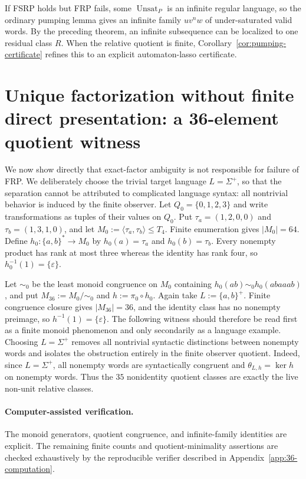\documentclass[11pt,a4paper]{article}
\newcommand{\eps}{\varepsilon}
\newcommand{\Unsat}{\operatorname{Unsat}}
\begin{document}
If FSRP holds but FRP fails, some $\Unsat_P$ is an infinite regular language, so the ordinary pumping lemma gives an infinite family $uv^nw$ of under-saturated valid words.  By the preceding theorem, an infinite subsequence can be localized to one residual class $R$.  When the relative quotient is finite, Corollary~\ref{cor:pumping-certificate} refines this to an explicit automaton-lasso certificate.

\section{Unique factorization without finite direct presentation: a 36-element quotient witness}
\label{sec:36}

We now show directly that exact-factor ambiguity is not responsible for
failure of FRP.  We deliberately choose the trivial target language
$L=\Sigma^+$, so that the separation cannot be attributed to complicated
language syntax: all nontrivial behavior is induced by the finite observer.
Let $Q_0=\{0,1,2,3\}$ and write transformations as
tuples of their values on $Q_0$.  Put
\(\tau_a=(1,2,0,0)\) and \(\tau_b=(1,3,1,0)\), and let
\(M_0:=\langle\tau_a,\tau_b\rangle\le T_4.\)
Finite enumeration gives $|M_0|=64$.  Define
\(h_0:\{a,b\}^*\to M_0\) by
$h_0(a)=\tau_a$ and $h_0(b)=\tau_b$.  Every nonempty product has rank
at most three whereas the identity has rank four, so
\(h_0^{-1}(1)=\{\eps\}.\)

Let $\sim_0$ be the least monoid congruence on $M_0$ containing
\(h_0(ab)\sim_0h_0(abaaab)\), and put
\(M_{36}:=M_0/{\sim_0}\) and \(h:=\pi_0\circ h_0\).
Again take $L:=\{a,b\}^+$.  Finite congruence closure gives
$|M_{36}|=36$, and the identity class has no nonempty preimage, so
$h^{-1}(1)=\{\eps\}$.  The following witness should therefore be read first as a finite monoid phenomenon and only secondarily as a language example.  Choosing $L=\Sigma^+$ removes all nontrivial syntactic distinctions between nonempty words and isolates the obstruction entirely in the finite observer quotient.  Indeed, since $L=\Sigma^+$, all nonempty words are syntactically congruent and $\theta_{L,h}=\ker h$ on nonempty words.
Thus the $35$ nonidentity quotient classes are exactly the live
non-unit relative classes.

\paragraph{Computer-assisted verification.}
The monoid generators, quotient congruence, and infinite-family identities are explicit.  The remaining finite counts and quotient-minimality assertions are checked exhaustively by the reproducible verifier described in Appendix~\ref{app:36-computation}.
\end{document}
